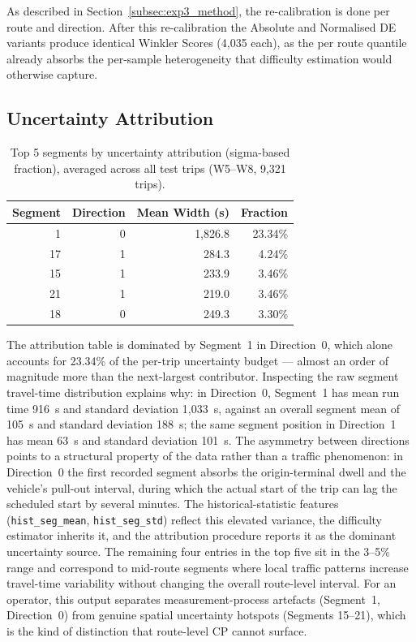 \documentclass[12pt, a4paper, oneside]{report}
\begin{document}
As described in Section~\ref{subsec:exp3_method}, the re-calibration is done per route and direction. After this re-calibration the Absolute and Normalised DE variants produce identical Winkler Scores (4,035 each), as the per route quantile already absorbs the per-sample heterogeneity that difficulty estimation would otherwise capture.

\subsection{Uncertainty Attribution}

\begin{table}[H]
\centering
\caption{Top 5 segments by uncertainty attribution (sigma-based fraction), averaged across all test trips (W5--W8, 9,321 trips).}
\label{tab:exp3_attribution}
\begin{tabular}{rrrr}
\toprule
\textbf{Segment} & \textbf{Direction} & \textbf{Mean Width (s)} & \textbf{Fraction} \\
\midrule
1 & 0 & 1,826.8 & 23.34\% \\
17 & 1 & 284.3 & 4.24\% \\
15 & 1 & 233.9 & 3.46\% \\
21 & 1 & 219.0 & 3.46\% \\
18 & 0 & 249.3 & 3.30\% \\
\bottomrule
\end{tabular}
\end{table}

The attribution table is dominated by Segment~1 in Direction~0, which alone accounts for 23.34\% of the per-trip uncertainty budget --- almost an order of magnitude more than the next-largest contributor. Inspecting the raw segment travel-time distribution explains why: in Direction~0, Segment~1 has mean run time 916~s and standard deviation 1{,}033~s, against an overall segment mean of 105~s and standard deviation 188~s; the same segment position in Direction~1 has mean 63~s and standard deviation 101~s. The asymmetry between directions points to a structural property of the data rather than a traffic phenomenon: in Direction~0 the first recorded segment absorbs the origin-terminal dwell and the vehicle's pull-out interval, during which the actual start of the trip can lag the scheduled start by several minutes. The historical-statistic features (\texttt{hist\_seg\_mean}, \texttt{hist\_seg\_std}) reflect this elevated variance, the difficulty estimator inherits it, and the attribution procedure reports it as the dominant uncertainty source. The remaining four entries in the top five sit in the 3--5\% range and correspond to mid-route segments where local traffic patterns increase travel-time variability without changing the overall route-level interval. For an operator, this output separates measurement-process artefacts (Segment~1, Direction~0) from genuine spatial uncertainty hotspots (Segments 15--21), which is the kind of distinction that route-level CP cannot surface.
\end{document}
